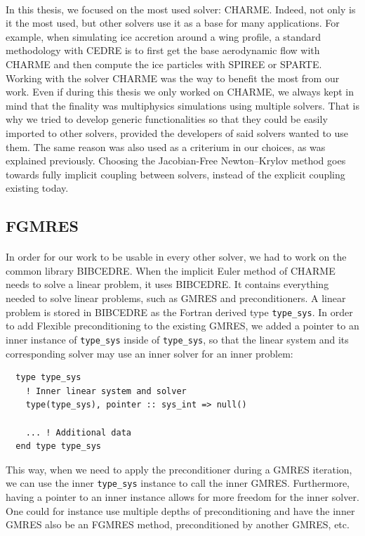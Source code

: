     \paragraph{}
    In this thesis, we focused on the most used solver: CHARME.
    Indeed, not only is it the most used, but other solvers use it as a base for many applications.
    For example, when simulating ice accretion around a wing profile, a standard methodology with CEDRE is to first get the base aerodynamic flow with CHARME and then compute the ice particles with SPIREE or SPARTE.
    Working with the solver CHARME was the way to benefit the most from our work.
    Even if during this thesis we only worked on CHARME, we always kept in mind that the finality was multiphysics simulations using multiple solvers.
    That is why we tried to develop generic functionalities so that they could be easily imported to other solvers, provided the developers of said solvers wanted to use them.
    The same reason was also used as a criterium in our choices, as was explained previously.
    Choosing the Jacobian-Free Newton--Krylov method goes towards fully implicit coupling between solvers, instead of the explicit coupling existing today.

    \subsection{FGMRES}

      \paragraph{}
      In order for our work to be usable in every other solver, we had to work on the common library BIBCEDRE.
      When the implicit Euler method of CHARME needs to solve a linear problem, it uses BIBCEDRE.
      It contains everything needed to solve linear problems, such as GMRES and preconditioners.
      A linear problem is stored in BIBCEDRE as the Fortran derived type \texttt{type_sys}.
      In order to add Flexible preconditioning to the existing GMRES, we added a pointer to an inner instance of \texttt{type_sys} inside of \texttt{type_sys}, so that the linear system and its corresponding solver may use an inner solver for an inner problem:
\begin{verbatim}
  type type_sys
    ! Inner linear system and solver
    type(type_sys), pointer :: sys_int => null()

    ... ! Additional data
  end type type_sys
\end{verbatim}
      This way, when we need to apply the preconditioner during a GMRES iteration, we can use the inner \texttt{type_sys} instance to call the inner GMRES.
      Furthermore, having a pointer to an inner instance allows for more freedom for the inner solver.
      One could for instance use multiple depths of preconditioning and have the inner GMRES also be an FGMRES method, preconditioned by another GMRES, etc.



